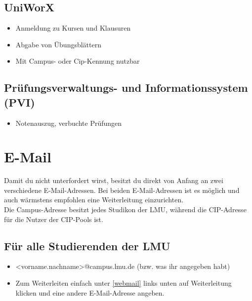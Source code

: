 \subsection*{UniWorX\subjectList{\subjectMI{}\subjectI{}}}
\begin{itemize}
	\item Anmeldung zu Kursen und Klausuren
	\item Abgabe von Übungsblättern
	\item Mit Campus- oder Cip-Kennung nutzbar
\end{itemize}
\begin{urlList}
\end{urlList}

\subsection*{Prüfungsverwaltungs- und Informationssystem (PVI)\subjectList{\subjectMI{}\subjectI{}}}
\begin{itemize}
	\item Notenauszug, verbuchte Prüfungen
\end{itemize}
\begin{urlList}
\end{urlList}

\section{E-Mail}
Damit du nicht unterfordert wirst, besitzt du direkt von Anfang an zwei verschiedene E-Mail-Adressen. Bei beiden E-Mail-Adressen ist es möglich und auch wärmstens empfohlen eine Weiterleitung einzurichten.\\

Die Campus-Adresse besitzt jedes Studikon der LMU, während die CIP-Adresse für die Nutzer der CIP-Pools ist.

\subsection*{Für alle Studierenden der LMU}
\begin{itemize}
	\item <vorname.nachname>@campus.lmu.de (bzw. was ihr angegeben habt)
	\item Zum Weiterleiten einfach unter \ref{webmail} links unten auf Weiterleitung klicken und eine andere E-Mail-Adresse angeben.
\end{itemize}
	\begin{urlList}
		\end{urlList} 

